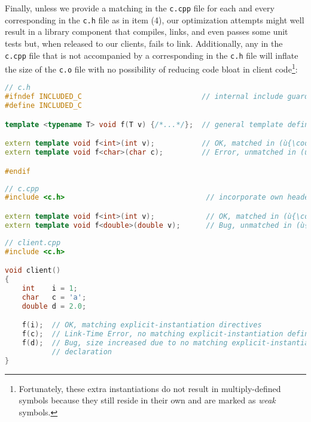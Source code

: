 Finally, unless we provide a matching  in the \lstinline!c.cpp! file for each and every
corresponding  in the
\lstinline!c.h! file as in item (4), our optimization attempts might well
result in a library component that compiles, links, and even passes some
unit tests but, when released to our clients, fails to link.
Additionally, any  in
the \lstinline!c.cpp! file that is not accompanied by a corresponding
 in the \lstinline!c.h!
file will inflate the size of the \lstinline!c.o! file with no possibility
of reducing code bloat in client code{\cprotect\footnote{Fortunately,
these extra instantiations do not result in multiply-defined symbols
because they still reside in their own  and are marked
  as \emph{weak} symbols.}}:

\begin{lstlisting}[language=C++]
// c.h
#ifndef INCLUDED_C                            // internal include guard
#define INCLUDED_C

template <typename T> void f(T v) {/*...*/};  // general template definition

extern template void f<int>(int v);           // OK, matched in (ù{\codeincomments{c.cpp}}ù)
extern template void f<char>(char c);         // Error, unmatched in (ù{\codeincomments{.cpp}}ù) file

#endif
\end{lstlisting}
\vspace*{2ex}   %
\begin{lstlisting}[language=C++]
// c.cpp
#include <c.h>                                 // incorporate own header first

extern template void f<int>(int v);            // OK, matched in (ù{\codeincomments{c.h}}ù)
extern template void f<double>(double v);      // Bug, unmatched in (ù{\codeincomments{c.h}}ù) file
\end{lstlisting}
\vspace*{2ex}   %
\begin{lstlisting}[language=C++]
// client.cpp
#include <c.h>

void client()
{
    int    i = 1;
    char   c = 'a';
    double d = 2.0;

    f(i);  // OK, matching explicit-instantiation directives
    f(c);  // Link-Time Error, no matching explicit-instantiation definition
    f(d);  // Bug, size increased due to no matching explicit-instantiation 
           // declaration
}
\end{lstlisting}
    
